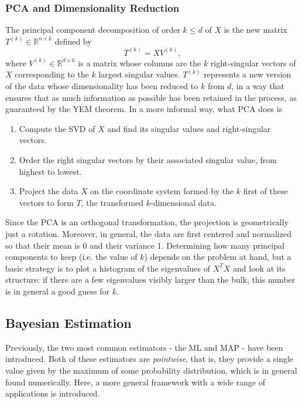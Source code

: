 \documentclass{article}
\begin{document}
\subsubsection*{PCA and Dimensionality Reduction}
The principal component decomposition of order $k\leq d$ of $X$ is the new matrix $T^{(k)} \in \mathbb{R}^{n\times k}$ defined by
\begin{equation}
    T^{(k)} = XV^{(k)},
\end{equation}
where $V^{(k)} \in \mathbb{R}^{d\times k}$ is a matrix whose columns are the $k$ right-singular vectors of $X$ corresponding to the $k$ largest singular values. $T^{(k)}$ represents a new version of the data whose dimensionality has been reduced to $k$ from $d$, in a way that ensures that as much information as possible has been retained in the process, as guaranteed by the YEM theorem. In a more informal way, what PCA does is
\begin{enumerate}
    \item Compute the SVD of $X$ and find its singular values and right-singular vectors.
    \item Order the right singular vectors by their associated singular value, from highest to lowest.
    \item Project the data $X$ on the coordinate system formed by the $k$ first of these vectors to form $T$, the transformed $k$-dimensional data.
\end{enumerate}
Since the PCA is an orthogonal transformation, the projection is geometrically just a rotation. Moreover, in general, the data are first centered and normalized so that their mean is 0 and their variance 1. Determining how many principal components to keep (i.e. the value of $k$) depends on the problem at hand, but a basic strategy is to plot a histogram of the eigenvalues of $X^TX$ and look at its structure: if there are a few eigenvalues visibly larger than the bulk, this number is in general a good guess for $k$.

\subsection{Bayesian Estimation}
Previously, the two most common estimators - the ML and MAP - have been introduced. Both of these estimators are \emph{pointwise}, that is, they provide a single value given by the maximum of some probability distribution, which is in general found numerically. Here, a more general framework with a wide range of applications is introduced.
\end{document}
